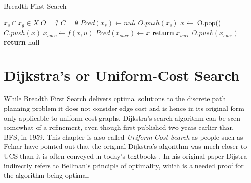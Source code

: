 \begin{algorithm}
    \caption{Breadth First Search}\label{alg:BFS}
    \begin{algorithmic}[1]
        \Require $x_s \cap x_g \in X$
        \State $O = \emptyset$
        \State $C = \emptyset$
        \State $Pred(x_s) \gets null$
        \State $O.push(x_s)$
            \State $x \gets$ O.pop()
            \State $C.push(x)$
                    \State $x_{succ} \gets f(x,u)$
                            \State $Pred(x_{succ}) \gets x$
                                \State \textbf{return} $x_{succ}$
                            \EndIf
                            \State $O.push(x_{succ})$
                        \EndIf
                    \EndIf
                \EndFor
        \EndWhile
        \State \textbf{return} null
    \end{algorithmic}
\end{algorithm}

\section{Dijkstra's or Uniform-Cost Search}
While Breadth First Search delivers optimal solutions to the discrete path planning problem it does not consider edge cost and is hence in its original form only applicable to uniform cost graphs. Dijkstra's search algorithm can be seen somewhat of a refinement, even though first published two years earlier than BFS, in 1959. This chapter is also called \emph{Uniform-Cost Search} as people such as Felner have pointed out that the original Dijkstra's algorithm was much closer to UCS than it is often conveyed in today's textbooks \cite{Felner.}. In his original paper Dijstra indirectly refers to Bellman's principle of optimality, which is a needed proof for the algorithm being optimal.

